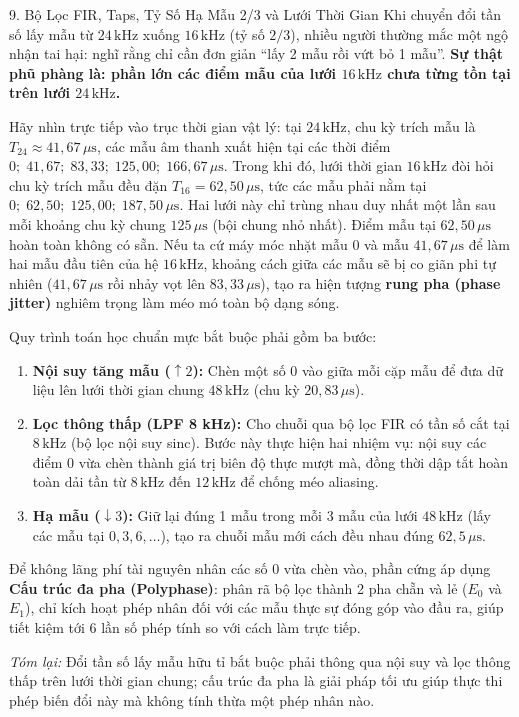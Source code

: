 \begin{feynmanbox}{9. Bộ Lọc FIR, Taps, Tỷ Số Hạ Mẫu 2/3 và Lưới Thời Gian}
Khi chuyển đổi tần số lấy mẫu từ $24\,\text{kHz}$ xuống $16\,\text{kHz}$ (tỷ số $2/3$), nhiều người thường mắc một ngộ nhận tai hại: nghĩ rằng chỉ cần đơn giản ``lấy 2 mẫu rồi vứt bỏ 1 mẫu''. \textbf{Sự thật phũ phàng là: phần lớn các điểm mẫu của lưới $16\,\text{kHz}$ chưa từng tồn tại trên lưới $24\,\text{kHz}$.}

Hãy nhìn trực tiếp vào trục thời gian vật lý: tại $24\,\text{kHz}$, chu kỳ trích mẫu là $T_{24} \approx 41{,}67\,\mu\text{s}$, các mẫu âm thanh xuất hiện tại các thời điểm $0;\; 41{,}67;\; 83{,}33;\; 125{,}00;\; 166{,}67\,\mu\text{s}$. Trong khi đó, lưới thời gian $16\,\text{kHz}$ đòi hỏi chu kỳ trích mẫu đều đặn $T_{16} = 62{,}50\,\mu\text{s}$, tức các mẫu phải nằm tại $0;\; 62{,}50;\; 125{,}00;\; 187{,}50\,\mu\text{s}$. Hai lưới này chỉ trùng nhau duy nhất một lần sau mỗi khoảng chu kỳ chung $125\,\mu\text{s}$ (bội chung nhỏ nhất). Điểm mẫu tại $62{,}50\,\mu\text{s}$ hoàn toàn không có sẵn. Nếu ta cứ máy móc nhặt mẫu $0$ và mẫu $41{,}67\,\mu\text{s}$ để làm hai mẫu đầu tiên của hệ $16\,\text{kHz}$, khoảng cách giữa các mẫu sẽ bị co giãn phi tự nhiên ($41{,}67\,\mu\text{s}$ rồi nhảy vọt lên $83{,}33\,\mu\text{s}$), tạo ra hiện tượng \textbf{rung pha (phase jitter)} nghiêm trọng làm méo mó toàn bộ dạng sóng.

Quy trình toán học chuẩn mực bắt buộc phải gồm ba bước:
\begin{enumerate}[leftmargin=1.4em]
    \item \textbf{Nội suy tăng mẫu ($\uparrow 2$):} Chèn một số 0 vào giữa mỗi cặp mẫu để đưa dữ liệu lên lưới thời gian chung $48\,\text{kHz}$ (chu kỳ $20{,}83\,\mu\text{s}$).
    \item \textbf{Lọc thông thấp (LPF 8 kHz):} Cho chuỗi qua bộ lọc FIR có tần số cắt tại $8\,\text{kHz}$ (bộ lọc nội suy sinc). Bước này thực hiện hai nhiệm vụ: nội suy các điểm 0 vừa chèn thành giá trị biên độ thực mượt mà, đồng thời dập tắt hoàn toàn dải tần từ $8\,\text{kHz}$ đến $12\,\text{kHz}$ để chống méo aliasing.
    \item \textbf{Hạ mẫu ($\downarrow 3$):} Giữ lại đúng 1 mẫu trong mỗi 3 mẫu của lưới $48\,\text{kHz}$ (lấy các mẫu tại $0, 3, 6, \dots$), tạo ra chuỗi mẫu mới cách đều nhau đúng $62{,}5\,\mu\text{s}$.
\end{enumerate}
Để không lãng phí tài nguyên nhân các số 0 vừa chèn vào, phần cứng áp dụng \textbf{Cấu trúc đa pha (Polyphase)}: phân rã bộ lọc thành 2 pha chẵn và lẻ ($E_0$ và $E_1$), chỉ kích hoạt phép nhân đối với các mẫu thực sự đóng góp vào đầu ra, giúp tiết kiệm tới $6$ lần số phép tính so với cách làm trực tiếp.

\emph{Tóm lại:} Đổi tần số lấy mẫu hữu tỉ bắt buộc phải thông qua nội suy và lọc thông thấp trên lưới thời gian chung; cấu trúc đa pha là giải pháp tối ưu giúp thực thi phép biến đổi này mà không tính thừa một phép nhân nào.
\end{feynmanbox}


